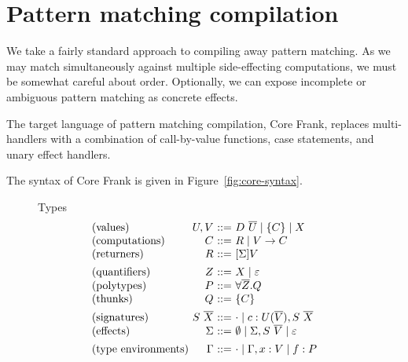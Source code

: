 \documentclass[preprint]{sigplanconf}
\makeatletter
\newcommand{\many}{\overline}
\newcommand\ba{\begin{array}}
\newcommand\ea{\end{array}}
\newenvironment{syntax}{\[\ba{@{}l@{~}r@{~}c@{~}l@{}}}{\ea\]}
\newcommand{\sig}{S}
\newcommand{\sigs}{\Sigma}
\newcommand{\effbox}[1]{[#1]}
\newcommand{\thunk}[1]{\{{#1}\}}
\newcommand\slab[1]{(\textrm{#1})}
\makeatother
\begin{document}
\section{Pattern matching compilation}
\label{sec:core}

We take a fairly standard approach to compiling away pattern
matching. As we may match simultaneously against multiple
side-effecting computations, we must be somewhat careful about
order. Optionally, we can expose incomplete or ambiguous pattern
matching as concrete effects.

The target language of pattern matching compilation, Core Frank,
replaces multi-handlers with a combination of call-by-value functions,
case statements, and unary effect handlers.

The syntax of Core Frank is given in Figure~\ref{fig:core-syntax}.
%
\begin{figure}
Types
\begin{syntax}
\slab{values}       &U, V          &::=& D~\many{U} \mid \thunk{C} \mid X \\
\slab{computations} &C             &::=& R \mid V \to C \\
\slab{returners}    &R             &::=& \effbox{\sigs}V
\\[1ex]
\slab{quantifiers}  &Z             &::=& X \mid \varepsilon \\
\slab{polytypes}    &P             &::=& \forall \many{Z}.Q \\
\slab{thunks}       &Q             &::=& \thunk{C}
\\[1ex]
\slab{signatures}   &\sig~\many{X} &::=& \cdot \mid c : U(\many{V}), \sig~\many{X} \\
\slab{effects}      &\sigs         &::=&
  \emptyset \mid \sigs, \sig~\many{V} \mid \varepsilon
\\[1ex]
\slab{type environments}
                    &\Gamma        &::=& \cdot \mid \Gamma, x:V \mid f:P \\
\end{syntax}


\end{figure}
\end{document}
